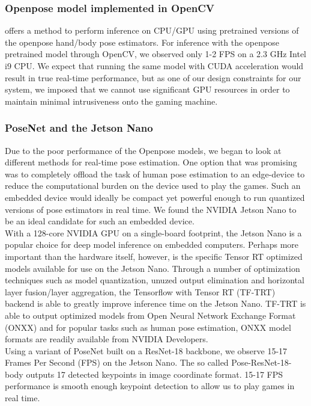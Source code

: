 \documentclass[10pt,twocolumn,letterpaper]{article}
\begin{document}
\subsubsection{Openpose model implemented in OpenCV}
\cite{opencvPose} offers a method to perform inference on CPU/GPU using pretrained versions of the 
openpose hand/body pose estimators. For inference with the openpose pretrained model through 
OpenCV, we observed only 1-2 FPS on a 2.3 GHz Intel i9 CPU. We expect that running the same model 
with CUDA acceleration would result in true real-time performance, but as one of our design 
constraints for our system, we imposed that we cannot use significant GPU resources in order to 
maintain minimal intrusiveness onto the gaming machine.

\subsubsection{PoseNet and the Jetson Nano}
Due to the poor performance of the Openpose models, we began to look at different methods for 
real-time pose estimation. One option that was promising was to completely offload the task of 
human pose estimation to an edge-device to reduce the computational burden on the device used 
to play the games. Such an embedded device would ideally be compact yet powerful enough to run 
quantized versions of pose estimators in real time. We found the NVIDIA Jetson Nano to be an 
ideal candidate for such an embedded device.\\

With a 128-core NVIDIA GPU on a single-board footprint, the Jetson Nano is a popular 
choice for deep model inference on embedded computers. Perhaps more important than the hardware 
itself, however, is the specific Tensor RT optimized models available for use on the Jetson Nano. 
Through a number of optimization techniques such as model quantization, unuzed output elimination 
and horizontal layer fusion/layer aggregation, the Tensorflow with Tensor RT (TF-TRT) backend is 
able to greatly improve inference time on the Jetson Nano. TF-TRT is able to output optimized 
models from Open Neural Network Exchange Format (ONXX) and for popular tasks such as human pose 
estimation, ONXX model formats are readily available from NVIDIA Developers.\\

Using a variant of PoseNet built on a ResNet-18 backbone, we observe 15-17 Frames Per Second 
(FPS) on the Jetson Nano. The so called Pose-ResNet-18-body outputs 17 detected keypoints in 
image coordinate format. 15-17 FPS performance is smooth enough keypoint detection to allow us to 
play games in real time.
\end{document}
